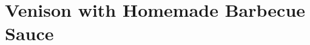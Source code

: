 \thispagestyle{fancy}
\section{Venison with Homemade Barbecue Sauce}
\AddToShipoutPicture*{\VenisonBBQ}